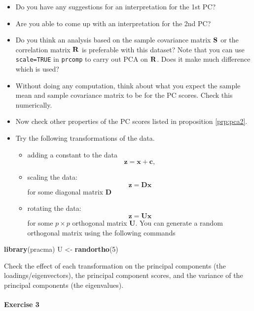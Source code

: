 \documentclass[]{book}
\newenvironment{Shaded}{\begin{snugshade}}{\end{snugshade}}
\newcommand{\DecValTok}[1]{\textcolor[rgb]{0.00,0.00,0.81}{#1}}
\newcommand{\KeywordTok}[1]{\textcolor[rgb]{0.13,0.29,0.53}{\textbf{#1}}}
\newcommand{\NormalTok}[1]{#1}
\newcommand{\StringTok}[1]{\textcolor[rgb]{0.31,0.60,0.02}{#1}}
\let\oldparagraph\paragraph
\renewcommand{\paragraph}[1]{\oldparagraph{#1}\mbox{}}
\theoremstyle{definition}
\theoremstyle{definition}
\theoremstyle{definition}
\theoremstyle{remark}
\begin{document}
\begin{itemize}
\item
  Do you have any suggestions for an interpretation for the 1st PC?
\item
  Are you able to come up with an interpretation for the 2nd PC?
\item
  Do you think an analysis based on the sample covariance matrix \({\bf S}\) or the
  correlation matrix \({\bf R}\) is preferable with this dataset? Note that you can use \texttt{scale=TRUE} in \texttt{prcomp}
  to carry out PCA on \({\bf R}\). Does it make much difference which is used?
\item
  Without doing any computation, think about what you expect the sample mean and sample covariance matrix to be for the PC scores. Check this numerically.
\item
  Now check other properties of the PC scores listed in proposition \ref{prp:pca2}.
\item
  Try the following transformations of the data.

  \begin{itemize}
  \item
    adding a constant to the data
    \[\mathbf z= \mathbf x+\mathbf c,\]
  \item
    scaling the data:
    \[\mathbf z= \mathbf D\mathbf x\]
    for some diagonal matrix \(\mathbf D\)
  \item
    rotating the data:
    \[\mathbf z= \mathbf U\mathbf x\]
    for some \(p\times p\) orthogonal matrix \(\mathbf U\).
    You can generate a random orthogonal matrix using the following commands
  \end{itemize}
\end{itemize}

\begin{Shaded}
\begin{Highlighting}[]
\KeywordTok{library}\NormalTok{(pracma)}
\NormalTok{U <-}\StringTok{ }\KeywordTok{randortho}\NormalTok{(}\DecValTok{5}\NormalTok{)}
\end{Highlighting}
\end{Shaded}

Check the effect of each transformation on the principal components (the loadings/eigenvectors), the principal component scores, and the variance of the principal components (the eigenvalues).

\hypertarget{exercise-3}{%
\paragraph{Exercise 3}\label{exercise-3}}
\end{document}
